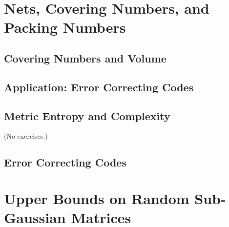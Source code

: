 \documentclass{report}
\theoremstyle{definition}
\newenvironment{exercise}[1]{
  \renewcommand\theexerciseimpl{#1}
  \exerciseimpl
}{\endexerciseimpl}
\begin{document}
\begin{exercise}{4.1.8}
\end{exercise}

\section{Nets, Covering Numbers, and Packing Numbers}

\begin{exercise}{4.2.5}
\end{exercise}

\begin{exercise}{4.2.9}
\end{exercise}

\begin{exercise}{4.2.10}
\end{exercise}

\subsection{Covering Numbers and Volume}

\begin{exercise}{4.2.15}
\end{exercise}

\begin{exercise}{4.2.16}
\end{exercise}

\subsection{Application: Error Correcting Codes}

\subsection{Metric Entropy and Complexity}

(No exercises.)

\subsection{Error Correcting Codes}

\begin{exercise}{4.3.7}
\end{exercise}

\section{Upper Bounds on Random Sub-Gaussian Matrices}
\end{document}

